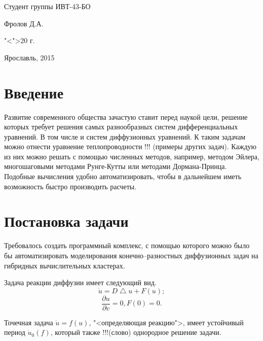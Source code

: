 \documentclass[a4paper, 14pt]{article}
\theoremstyle{definition}
\begin{document}
{\bigskip 

\begin{flushright}
	Студент группы ИВТ-43-БО\par
	\underline{\hspace{2.5cm}}Фролов Д.А.\par
	"<\underline{\hspace{0.8cm}}">\underline{\hspace{3.5cm}}20\underline{\hspace{0.5cm}} г.\par
\end{flushright}

\vspace{\fill}

\begin{center}
	Ярославль, 2015
\end{center}

\clearpage

}

\section*{Введение}

\par Развитие современного общества зачастую ставит перед наукой цели, решение которых требует решения самых разнообразных систем дифференциальных уравнений. В том числе и систем диффузионных уравнений. К таким задачам можно отнести уравнение теплопроводности !!! (примеры других задач). Каждую из них можно решать с помощью численных методов, например, методом Эйлера, многошаговыми методами Рунге-Кутты или методами Дормана-Принца. Подобные вычисления удобно автоматизировать, чтобы в дальнейшем иметь возможность быстро производить расчеты.

\newpage
\section{Постановка задачи}

\par Требовалось создать программный комплекс, с помощью которого можно было бы автоматизировать моделирования конечно--разностных диффузионных задач на гибридных вычислительных кластерах.

\par Задача реакции диффузии имеет следующий вид.
$$\dot u = D \bigtriangleup u + F(u);$$
$$\frac{\partial u}{\partial v} = 0, F(0) = 0.$$

\par Точечная задача $\dot u = f(u)$, "<определяющая реакцию">, имеет устойчивый период $\dot u_0 (f)$, который также !!!(слово) однородное решение задачи.
\end{document}

